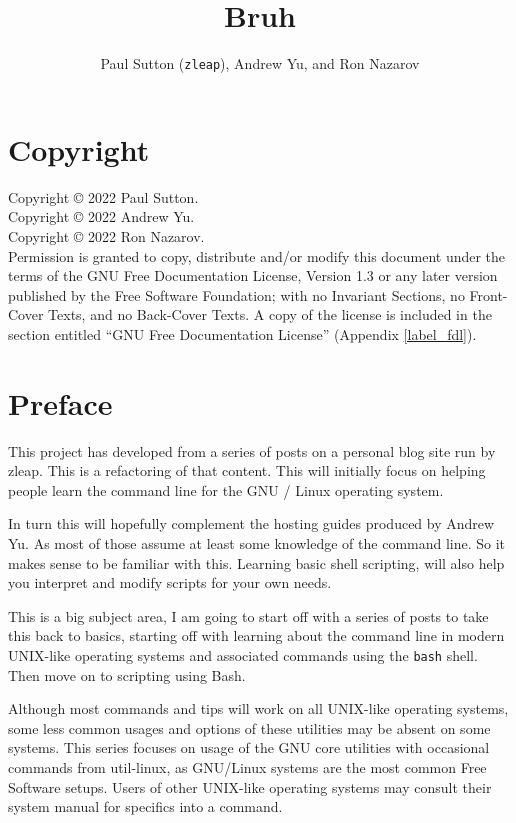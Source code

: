 \documentclass{extbook}
\title{Bruh}
\author{Paul Sutton (\texttt{zleap}), Andrew Yu, and Ron Nazarov}
\begin{document}
\maketitle

\frontmatter
\chapter{Copyright}

Copyright \copyright{}  2022  Paul Sutton.\\
Copyright \copyright{}  2022  Andrew Yu.\\
Copyright \copyright{}  2022  Ron Nazarov.\\
Permission is granted to copy, distribute and/or modify this document
under the terms of the GNU Free Documentation License, Version 1.3
or any later version published by the Free Software Foundation;
with no Invariant Sections, no Front-Cover Texts, and no Back-Cover Texts.
A copy of the license is included in the section entitled ``GNU
Free Documentation License'' (Appendix \ref{label_fdl}).

\chapter{Preface}

This project has developed from a series of posts on a personal blog site run by zleap. This is a refactoring of that content. This will initially focus on helping people learn the command line for the GNU / Linux operating system.

In turn this will hopefully complement the hosting guides produced by Andrew Yu. As most of those assume at least some knowledge of the command line. So it makes sense to be familiar with this. Learning basic shell scripting, will also help you interpret and modify scripts for your own needs.

This is a big subject area, I am going to start off with a series of posts to take this back to basics, starting off with learning about the command line in modern UNIX-like operating systems and associated commands using the \texttt{bash} shell. Then move on to scripting using Bash.

Although most commands and tips will work on all UNIX-like operating systems, some less common usages and options of these utilities may be absent on some systems. This series focuses on usage of the GNU core utilities with occasional commands from util-linux, as GNU/Linux systems are the most common Free Software setups. Users of other UNIX-like operating systems may consult their system manual for specifics into a command.
\end{document}
